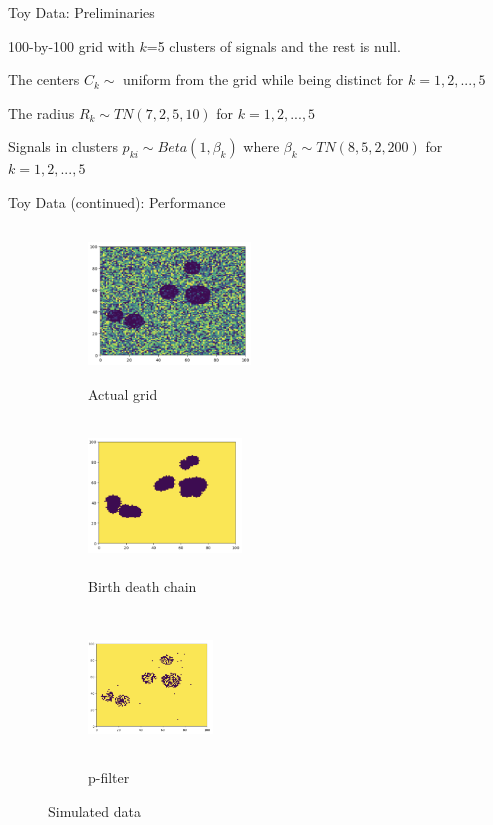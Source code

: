 \documentclass[10pt,mathserif]{beamer}
\begin{document}
\begin{frame} {Toy Data: Preliminaries}
\BIT
\item 100-by-100 grid with $k$=5 clusters of signals and the rest is null.
\item The centers $C_k \sim$  uniform from the grid while being distinct for $k = 1, 2, ..., 5$
\item The radius $R_k \sim T N (7, 2, 5, 10)$ for $k = 1, 2, ..., 5$
\item Signals in clusters $p_{ki} \sim Beta(1, \beta_k)$ where $\beta_k \sim TN(8, 5, 2, 200)$ for $k = 1, 2, ..., 5$
\EIT
\end{frame}

\begin{frame} {Toy Data (continued): Performance }
\begin{figure}[t!]
    \centering
    \begin{subfigure}[t]{0.3\textwidth}
        \centering
        \includegraphics[height=1.6in, width=1.7in]{../Actual_grid}
        \caption{Actual grid}
    \end{subfigure}%
    \begin{subfigure}[t]{0.3\textwidth}
        \centering
        \includegraphics[height=1.6in, width=1.6in]{../BDC_grid}
        \caption{Birth death chain}
    \end{subfigure}%
    \begin{subfigure}[t]{0.3\textwidth}
        \centering
        \includegraphics[height=1.6in, width=1.3in]{../pfilter_grid}
        \caption{p-filter}
    \end{subfigure}
    \caption{Simulated data}
\end{figure}
\end{frame}
\end{document}
